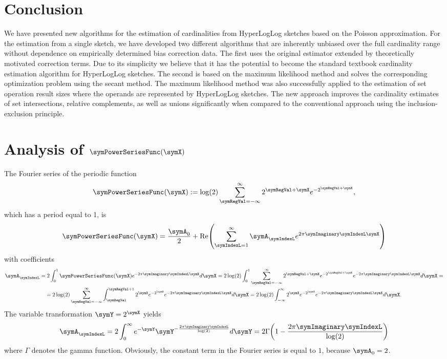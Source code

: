 \documentclass[a4paper]{scrartcl}
\renewcommand\Re{\operatorname{Re}}
\begin{document}
\section{Conclusion}
\label{sec:conclusion}
We have presented new algorithms for the estimation of cardinalities from HyperLogLog sketches based on the Poisson approximation. For the estimation from a single sketch, we have developed two different algorithms that are inherently unbiased over the full cardinality range without dependence on empirically determined bias correction data. The first uses the original estimator extended by theoretically motivated correction terms. Due to its simplicity we believe that it has the potential to become the standard textbook cardinality estimation algorithm for HyperLogLog sketches. The second is based on the maximum likelihood method and solves the corresponding optimization problem using the secant method. The maximum likelihood method was also successfully applied to the estimation of set operation result sizes where the operands are represented by HyperLogLog sketches. The new approach improves the cardinality estimates of set intersections, relative complements, as well as unions significantly when compared to the conventional approach using the inclusion-exclusion principle.
\appendix

\section{Analysis of $\symPowerSeriesFunc(\symX)$}
\label{app:analysis_xi}
The Fourier series of the periodic function
\begin{equation}
\label{equ:def_xi}
\symPowerSeriesFunc(\symX):= \log(2) \sum_{\symRegVal = -\infty}^\infty
2^{\symRegVal+\symX}
e^{-2^{\symRegVal+\symX}},
\end{equation}
which has a period equal to 1, is
\begin{equation}
\symPowerSeriesFunc(\symX) = \frac{\symA_0}{2} + \Re\!\left(\sum_{\symIndexL=1}^{\infty}
\symA_\symIndexL e^{2\pi\symImaginary\symIndexL\symX}\right)
\end{equation}
with coefficients
\begin{multline}
\symA_\symIndexL = 2\int_0^1 \symPowerSeriesFunc(\symX) e^{-2\pi\symImaginary\symIndexL\symX}d\symX
=
2\log(2)
\int_0^1
\sum_{\symRegVal = -\infty}^\infty
2^{\symRegVal+\symX}
e^{-2^{\symRegVal+\symX}}
e^{-2\pi\symImaginary\symIndexL\symX}
d\symX
=
\\
=
2\log(2)
\sum_{\symRegVal = -\infty}^\infty
\int_{\symRegVal}^{\symRegVal+1}
2^{\symX}
e^{-2^{\symX}}
e^{-2\pi\symImaginary\symIndexL\symX}
d\symX
=
2\log(2) \int_{-\infty}^{\infty} 2^\symX
e^{-2^\symX}
e^{-2\pi\symImaginary\symIndexL\symX}d\symX.
\end{multline}
The variable transformation $\symY = 2^\symX$ yields
\begin{equation}
\symA_\symIndexL
=
2\int_{0}^{\infty} e^{-\symY}
\symY^{-\frac{2\pi\symImaginary\symIndexL}{\log(2)}}d\symY
= 
2\Gamma\!\left(1-\frac{2\pi\symImaginary\symIndexL}{\log(2)}\right)
\end{equation}
where $\Gamma$ denotes the gamma function. Obviously, the constant term in the Fourier series is equal to $1$, because $\symA_0=2$. 
\end{document}
